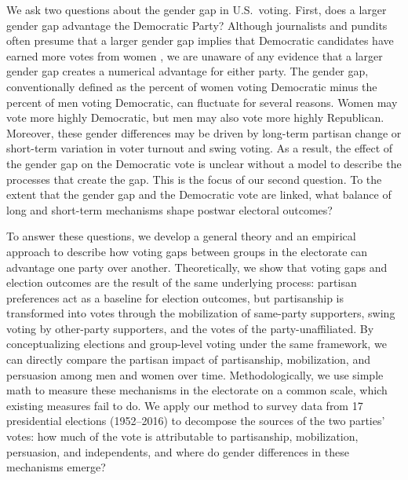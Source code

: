 \documentclass[12pt
               ,final
               ]{article}
\begin{document}
We ask two questions about the gender gap in U.S.\ voting. First, does a larger gender gap advantage the Democratic Party? Although journalists and pundits often presume that a larger gender gap implies that Democratic candidates have earned more votes from women \citep{kaufmann1999changing}, we are unaware of any evidence that a larger gender gap creates a numerical advantage for either party. The gender gap, conventionally defined as the percent of women voting Democratic minus the percent of men voting Democratic, can fluctuate for several reasons. Women may vote more highly Democratic, but men may also vote more highly Republican. Moreover, these gender differences may be driven by long-term partisan change or short-term variation in voter turnout and swing voting. As a result, the effect of the gender gap on the Democratic vote is unclear without a model to describe the processes that create the gap. This is the focus of our second question. To the extent that the gender gap and the Democratic vote are linked, what balance of long and short-term mechanisms shape postwar electoral outcomes?

To answer these questions, we develop a general theory and an empirical approach to describe how voting gaps between groups in the electorate can advantage one party over another. Theoretically, we show that voting gaps and election outcomes are the result of the same underlying process: partisan preferences act as a baseline for election outcomes, but partisanship is transformed into votes through the mobilization of same-party supporters, swing voting by other-party supporters, and the votes of the party-unaffiliated. 
By conceptualizing elections and group-level voting under the same framework, we can directly compare the partisan impact of partisanship, mobilization, and persuasion among men and women over time. Methodologically, we use simple math to measure these mechanisms in the electorate on a common scale, which existing measures fail to do. We apply our method to survey data from 17 presidential elections (1952--2016) to decompose the sources of the two parties' votes: how much of the vote is attributable to partisanship, mobilization, persuasion, and independents, and where do gender differences in these mechanisms emerge?

\end{document}
